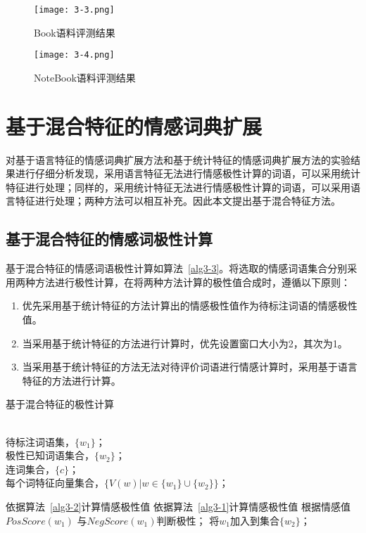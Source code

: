 \begin{figure}[htp]
\centering
\texttt{[image: 3-3.png]}
\caption{Book语料评测结果}
\label{fig3-3}
\end{figure}

\begin{figure}[htp]
\centering
\texttt{[image: 3-4.png]}
\caption{NoteBook语料评测结果}
\label{fig3-4}
\end{figure}

\section{基于混合特征的情感词典扩展}
对基于语言特征的情感词典扩展方法和基于统计特征的情感词典扩展方法的实验结果进行仔细分析发现，采用语言特征无法进行情感极性计算的词语，可以采用统计特征进行处理；同样的，采用统计特征无法进行情感极性计算的词语，可以采用语言特征进行处理；两种方法可以相互补充。因此本文提出基于混合特征方法。

\subsection{基于混合特征的情感词极性计算}
基于混合特征的情感词语极性计算如算法~\ref{alg3-3}。将选取的情感词语集合分别采用两种方法进行极性计算，在将两种方法计算的极性值合成时，遵循以下原则：

\begin{enumerate}
\item 优先采用基于统计特征的方法计算出的情感极性值作为待标注词语的情感极性值。
\item 当采用基于统计特征的方法进行计算时，优先设置窗口大小为2，其次为1。
\item 当采用基于统计特征的方法无法对待评价词语进行情感计算时，采用基于语言特征的方法进行计算。
\end{enumerate}

\begin{algorithm}[htp]
\caption{基于混合特征的极性计算}
\label{alg3-3}
\begin{algorithmic}[1]
\REQUIRE ~~\\
待标注词语集，$\{w_1\}$；\\
极性已知词语集合，$\{w_2\}$；\\
连词集合，$\{c\}$；\\
每个词特征向量集合，$\{V(w)|w \in \{w_1\}\cup \{w_2\} \}$；

\STATE 依据算法~\ref{alg3-2}计算情感极性值
\STATE 依据算法~\ref{alg3-1}计算情感极性值
\ENDIF
\STATE 根据情感值 $PosScore(w_1)$ 与$ NegScore(w_1) $判断极性；
\STATE 将$ w_1 $加入到集合$ \{w_2\} $；
\ENDFOR
\end{algorithmic}
\end{algorithm}

